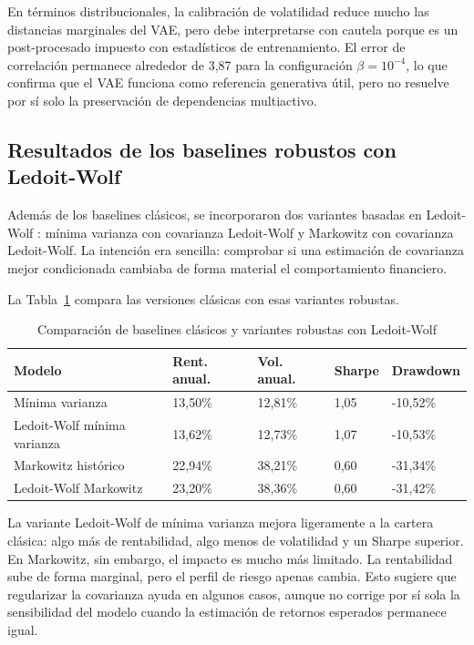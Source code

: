 \documentclass[11pt,a4paper,spanish,oneside]{book}
\numberwithin{equation}{chapter}
\numberwithin{figure}{chapter}
\begin{document}
En términos distribucionales, la calibración de volatilidad reduce mucho las distancias marginales del VAE, pero debe interpretarse con cautela porque es un post-procesado impuesto con estadísticos de entrenamiento. El error de correlación permanece alrededor de 3,87 para la configuración $\beta=10^{-4}$, lo que confirma que el VAE funciona como referencia generativa útil, pero no resuelve por sí solo la preservación de dependencias multiactivo.

\subsection{Resultados de los baselines robustos con Ledoit-Wolf}

Además de los baselines clásicos, se incorporaron dos variantes basadas en Ledoit-Wolf \cite{LedoitWolf2004}: mínima varianza con covarianza Ledoit-Wolf y Markowitz con covarianza Ledoit-Wolf. La intención era sencilla: comprobar si una estimación de covarianza mejor condicionada cambiaba de forma material el comportamiento financiero.

La Tabla~\ref{tab:resultados-ledoit-wolf} compara las versiones clásicas con esas variantes robustas.

{\small
\setlength{\tabcolsep}{3pt}
\renewcommand{\arraystretch}{1.2}
\begin{table}[H]
\centering
\begin{tabular}{|p{}|p{}|p{}|p{}|p{}|}
\hline
\textbf{Modelo} & \textbf{Rent. anual.} & \textbf{Vol. anual.} & \textbf{Sharpe} & \textbf{Drawdown} \\
\hline
Mínima varianza & 13,50\% & 12,81\% & 1,05 & -10,52\% \\
\hline
Ledoit-Wolf mínima varianza & 13,62\% & 12,73\% & 1,07 & -10,53\% \\
\hline
Markowitz histórico & 22,94\% & 38,21\% & 0,60 & -31,34\% \\
\hline
Ledoit-Wolf Markowitz & 23,20\% & 38,36\% & 0,60 & -31,42\% \\
\hline
\end{tabular}
\caption{Comparación de baselines clásicos y variantes robustas con Ledoit-Wolf}
\label{tab:resultados-ledoit-wolf}
\end{table}
}

La variante Ledoit-Wolf de mínima varianza mejora ligeramente a la cartera clásica: algo más de rentabilidad, algo menos de volatilidad y un Sharpe superior. En Markowitz, sin embargo, el impacto es mucho más limitado. La rentabilidad sube de forma marginal, pero el perfil de riesgo apenas cambia. Esto sugiere que regularizar la covarianza ayuda en algunos casos, aunque no corrige por sí sola la sensibilidad del modelo cuando la estimación de retornos esperados permanece igual.
\end{document}
